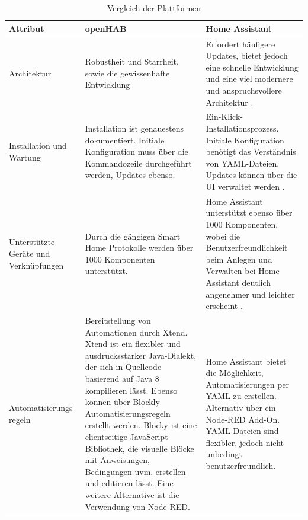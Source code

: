 \documentclass[
  ngerman           %
  ,twoside          %
  ,11pt
  ,pdftex
]{report}
\begin{document}
\chapter{}
\label{appendix:comparison}
\begin{table}[hbt!]
  \begin{center}
      \begin{tabular}{| p{3.0cm} | p{6.2cm} | p{6.2cm} | }
          \hline
            \textbf{Attribut} & \textbf{openHAB} & \textbf{Home Assistant} \\
          \hline
            Architektur & Robustheit und Starrheit, sowie die gewissenhafte Entwicklung & Erfordert häufigere Updates, bietet jedoch eine schnelle Entwicklung und eine viel modernere und anspruchsvollere Architektur \cite{sh-uni-comparison}. \\ 
          \hline
            Installation und Wartung & Installation ist genauestens dokumentiert. Initiale Konfiguration muss über die Kommandozeile durchgeführt werden, Updates ebenso. & Ein-Klick-Installationsprozess. Initiale Konfiguration benötigt das Verständnis von YAML-Dateien. Updates können über die UI verwaltet werden \cite{sh-uni-comparison}. \\ 
          \hline
            Unterstützte Geräte und Verknüpfungen & Durch die gängigen Smart Home Protokolle werden über 1000 Komponenten unterstützt. & Home Assistant unterstützt ebenso über 1000 Komponenten, wobei die Benutzerfreundlichkeit beim Anlegen und Verwalten bei Home Assistant deutlich angenehmer und leichter erscheint \cite{msuttner-comparison}. \\ 
          \hline
            Automatisierungs-regeln & Bereitstellung von Automationen durch Xtend. Xtend ist ein flexibler und ausdrucksstarker Java-Dialekt, der sich in Quellcode basierend auf Java 8 kompilieren lässt. Ebenso können über Blockly Automatisierungsregeln erstellt werden. Blocky ist eine clientseitige JavaScript Bibliothek, die visuelle Blöcke mit Anweisungen, Bedingungen uvm. erstellen und editieren lässt. Eine weitere Alternative ist die Verwendung von Node-RED.  & Home Assistant bietet die Möglichkeit, Automatisierungen per YAML zu erstellen. Alternativ über ein Node-RED Add-On. YAML-Dateien sind flexibler, jedoch nicht unbedingt benutzerfreundlich. \\ 
          \hline
      \end{tabular}
  \end{center}
  \caption{Vergleich der Plattformen \cite{sh-uni-comparison} \cite{msuttner-comparison} \cite{barclay-comparison}}
  \label{tab:comparisonTableHAOS-openHAB-part1}
\end{table}
\end{document}
